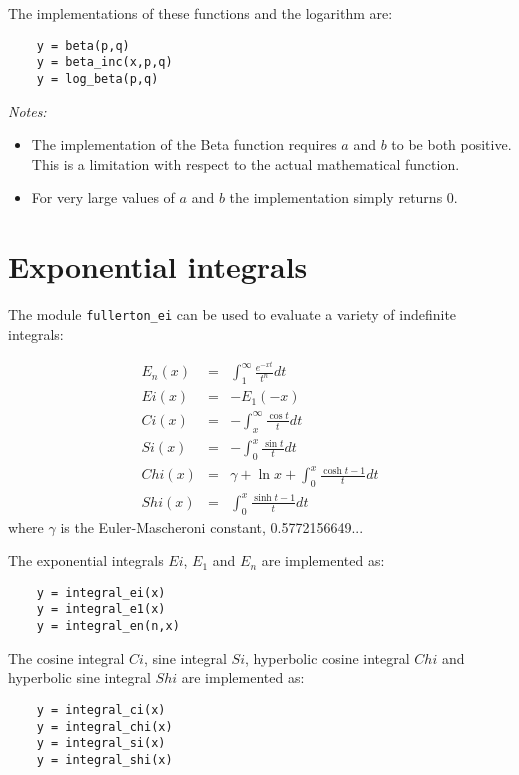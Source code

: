 \documentclass{article}
\begin{document}
The implementations of these functions and the logarithm are:

\begin{verbatim}
    y = beta(p,q)
    y = beta_inc(x,p,q)
    y = log_beta(p,q)
\end{verbatim}

\emph{Notes:}
\begin{itemize}
\item
The implementation of the Beta function requires $a$ and $b$ to be both positive. This is a limitation with
respect to the actual mathematical function.
\item
For very large values of $a$ and $b$ the implementation simply returns 0.
\end{itemize}


\section{Exponential integrals}
The module \verb+fullerton_ei+ can be used to evaluate a variety of indefinite integrals:

\begin{eqnarray}
    E_n(x) &=& \int^\infty_1 \frac{e^{-xt}}{t^n} dt              \\
    Ei(x)  &=& -E_1(-x)                                          \\
    Ci(x)  &=& -\int^\infty_x \frac{\cos t}{t} dt                \\
    Si(x)  &=& -\int^x_0 \frac{\sin t}{t} dt                     \\
    Chi(x) &=& \gamma + \ln x + \int^x_0 \frac{\cosh t -1}{t} dt \\
    Shi(x) &=& \int^x_0 \frac{\sinh t -1}{t} dt
\end{eqnarray}
\noindent where $\gamma$ is the Euler-Mascheroni constant, 0.5772156649...

The exponential integrals $Ei$, $E_1$ and $E_n$ are implemented as:

\begin{verbatim}
    y = integral_ei(x)
    y = integral_e1(x)
    y = integral_en(n,x)
\end{verbatim}

The cosine integral $Ci$, sine integral $Si$, hyperbolic cosine integral $Chi$ and
hyperbolic sine integral $Shi$ are implemented as:

\begin{verbatim}
    y = integral_ci(x)
    y = integral_chi(x)
    y = integral_si(x)
    y = integral_shi(x)
\end{verbatim}
\end{document}

